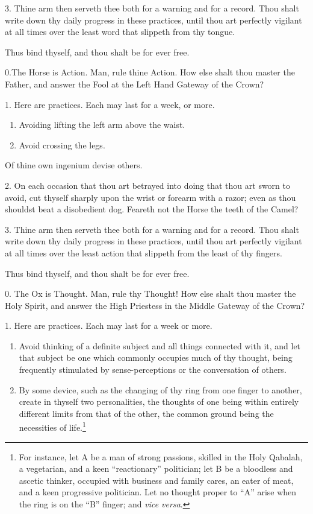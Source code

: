 3. Thine arm then serveth thee both for a warning and for a record. Thou shalt write down thy daily progress in these practices, until thou art perfectly vigilant at all times over the least word that slippeth from thy tongue.

Thus bind thyself, and thou shalt be for ever free.

0.The Horse is Action. Man, rule thine Action. How else shalt thou master the Father, and answer the Fool at the Left Hand Gateway of the Crown?

1. Here are practices. Each may last for a week, or more.

\begin{enumerate}[label=\greek*.]
\item Avoiding lifting the left arm above the waist.

\item Avoid crossing the legs.
\end{enumerate}

Of thine own ingenium devise others.

2. On each occasion that thou art betrayed into doing that thou art sworn to avoid, cut thyself sharply upon the wrist or forearm with a razor; even as thou shouldst beat a disobedient dog. Feareth not the Horse the teeth of the Camel?

3. Thine arm then serveth thee both for a warning and for a record. Thou shalt write down thy daily progress in these practices, until thou art perfectly vigilant at all times over the least action that slippeth from the least of thy fingers.

Thus bind thyself, and thou shalt be for ever free.

0. The Ox is Thought. Man, rule thy Thought! How else shalt thou master the Holy Spirit, and answer the High Priestess in the Middle Gateway of the Crown?

1. Here are practices. Each may last for a week or more.

\begin{enumerate}[label=\greek*.]
\item Avoid thinking of a definite subject and all things connected with it, and let that subject be one which commonly occupies much of thy thought, being frequently stimulated by sense-perceptions or the conversation of others.

\item By some device, such as the changing of thy ring from one finger to another, create in thyself two personalities, the thoughts of one being within entirely different limits from that of the other, the common ground being the necessities of life.\footnote{For instance, let A be a man of strong passions, skilled in the Holy Qabalah, a vegetarian, and a keen \enquote{reactionary} politician; let B be a bloodless and ascetic thinker, occupied with business and family cares, an eater of meat, and a keen progressive politician. Let no thought proper to \enquote{A} arise when the ring is on the \enquote{B} finger; and \textit{vice versa}.}
\end{enumerate}

